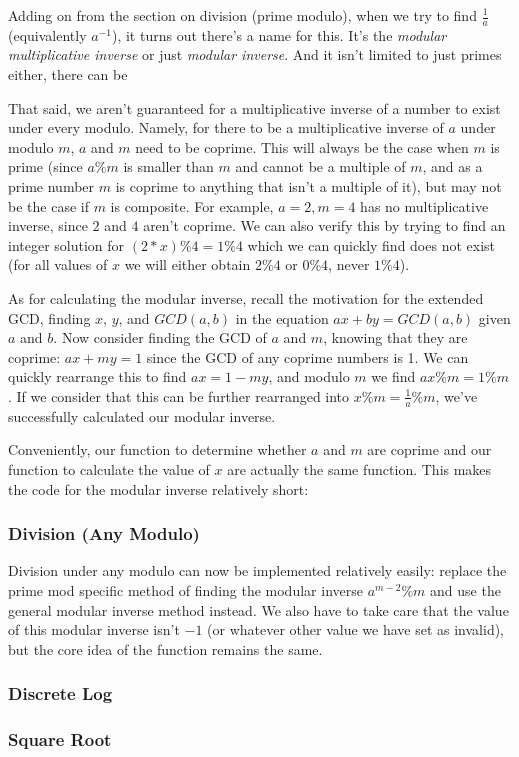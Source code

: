 Adding on from the section on division (prime modulo), when we try to find $\frac{1}{a}$ (equivalently $a^{-1}$), it turns out there's a name for this. It's the \textit{modular multiplicative inverse} or just \textit{modular inverse}. And it isn't limited to just primes either, there can be 

That said, we aren't guaranteed for a multiplicative inverse of a number to exist under every modulo. Namely, for there to be a multiplicative inverse of $a$ under modulo $m$, $a$ and $m$ need to be coprime. This will always be the case when $m$ is prime (since $a \% m$ is smaller than $m$ and cannot be a multiple of $m$, and as a prime number $m$ is coprime to anything that isn't a multiple of it), but may not be the case if $m$ is composite. For example, $a = 2, m = 4$ has no multiplicative inverse, since $2$ and $4$ aren't coprime. We can also verify this by trying to find an integer solution for $(2 * x) \% 4 = 1 \% 4$ which we can quickly find does not exist (for all values of $x$ we will either obtain $2 \% 4$ or $0 \% 4$, never $1 \% 4$).

As for calculating the modular inverse, recall the motivation for the extended GCD, finding $x$, $y$, and $GCD(a,b)$ in the equation $ax + by = GCD(a,b)$ given $a$ and $b$. Now consider finding the GCD of $a$ and $m$, knowing that they are coprime: $ax + my = 1$ since the GCD of any coprime numbers is 1. We can quickly rearrange this to find $ax = 1 - my$, and modulo $m$ we find $ax \% m = 1 \% m$. If we consider that this can be further rearranged into $x \% m = \frac{1}{a} \% m$, we've successfully calculated our modular inverse.

Conveniently, our function to determine whether $a$ and $m$ are coprime and our function to calculate the value of $x$ are actually the same function. This makes the code for the modular inverse relatively short:


\subsubsection{Division (Any Modulo)}

Division under any modulo can now be implemented relatively easily: replace the prime mod specific method of finding the modular inverse $a^{m-2}\%m$ and use the general modular inverse method instead. We also have to take care that the value of this modular inverse isn't $-1$ (or whatever other value we have set as invalid), but the core idea of the function remains the same.

\subsubsection{Discrete Log}

\subsubsection{Square Root}
